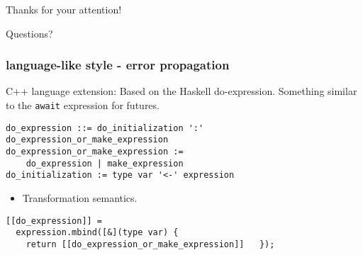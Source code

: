 \documentclass[xcolor=dvipsnames]{beamer}
\newcommand{\cpp}[1]{\lstinline{#1}}
\begin{document}
\begin{frame}
\begin{center}
\Large{Thanks for your attention!}
\end{center}
\begin{center}
\Large{Questions?}
\end{center}
\end{frame}









\begin{frame}[fragile]
\frametitle{language-like style  - error propagation}
C++ language extension: Based on the Haskell do-expression. Something similar to the \cpp{await} expression for futures.  

\begin{lstlisting}
do_expression ::= do_initialization ':' do_expression_or_make_expression
do_expression_or_make_expression := 
    do_expression | make_expression
do_initialization := type var '<-' expression
\end{lstlisting}

\begin{itemize}
  \item Transformation semantics.
\end{itemize}

\begin{lstlisting}
[[do_expression]] =
  expression.mbind([&](type var) {
    return [[do_expression_or_make_expression]]   });
    
\end{lstlisting}

\end{frame}
\end{document}
